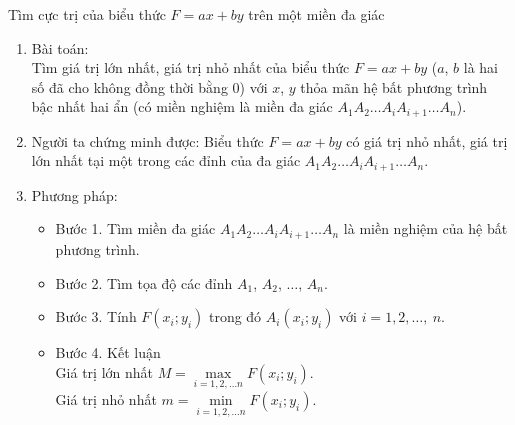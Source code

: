\begin{dang}{Tìm cực trị của biểu thức $F=ax+by$ trên một miền đa giác}
	\begin{enumerate}
		\item Bài toán: \\
		Tìm giá trị lớn nhất, giá trị nhỏ nhất của biểu thức $F=ax+by$ ($a$, $b$ là hai số đã cho không đồng thời bằng $0$) với $x$, $ y$ thỏa mãn hệ bất phương trình bậc nhất hai ẩn (có miền nghiệm là miền đa giác $A_1 A_2 \ldots A_i A_{i+1} \ldots A_n$).
		\item Người ta chứng minh được: Biểu thức $F=ax+by$  có giá trị nhỏ nhất, giá trị lớn nhất tại một trong các đỉnh của đa giác $A_1 A_2 \ldots A_i A_{i+1} \ldots A_n$.
		\item Phương pháp: 
		\begin{itemize}
			\item Bước 1. Tìm miền đa giác $A_1 A_2 \ldots A_i A_{i+1} \ldots A_n$ là miền nghiệm của hệ bất phương trình.
			\item Bước 2. Tìm tọa độ các đỉnh $A_1$, $A_2$, $\ldots$, $A_n$.
			\item Bước 3. Tính $F\left(x_i ; y_i\right)$ trong đó $A_i\left(x_i;y_i\right)$ với $i=1,2,\ldots,\ n$.
			\item Bước 4. Kết luận\\
			Giá trị lớn nhất $M=\max \limits_{i=1,2,\ldots n} F\left(x_i; y_i\right)$.\\
			Giá trị nhỏ nhất $m=\min\limits_{i=1,2,\ldots n} F\left(x_i; y_i\right)$.
		\end{itemize}
	\end{enumerate}
\end{dang}
\viduminhhoa
